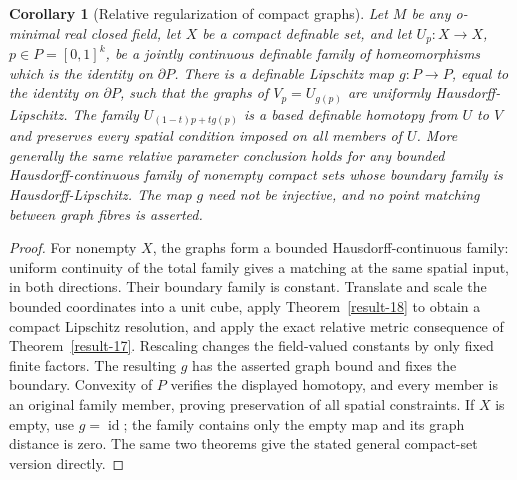 \documentclass[11pt,a4paper]{article}
\newtheorem{corollary}[theorem]{Corollary}
\theoremstyle{definition}
\begin{document}
\begin{corollary}[Relative regularization of compact graphs]\label{result-54}
Let $M$ be any o-minimal real closed field, let $X$ be a compact
definable set, and let $U_p:X\to X$, $p\in P=[0,1]^k$, be a jointly
continuous definable family of homeomorphisms which is the identity
on $\partial P$. There is a definable Lipschitz map $g:P\to P$,
equal to the identity on $\partial P$, such that the graphs of
$V_p=U_{g(p)}$ are uniformly Hausdorff-Lipschitz. The family
$U_{(1-t)p+tg(p)}$ is a based definable homotopy from $U$ to $V$ and
preserves every spatial condition imposed on all members of $U$.
More generally the same relative parameter conclusion holds for any
bounded Hausdorff-continuous family of nonempty compact sets whose
boundary family is Hausdorff-Lipschitz. The map $g$ need not be
injective, and no point matching between graph fibres is asserted.
\end{corollary}
\begin{proof}
For nonempty $X$, the graphs form a bounded Hausdorff-continuous family:
uniform continuity of the total family gives a matching at the same
spatial input, in both directions. Their boundary family is constant.
Translate and scale the bounded coordinates into a unit cube, apply
Theorem~\ref{result-18} to obtain a compact Lipschitz resolution, and
apply the exact relative metric consequence of Theorem~\ref{result-17}.
Rescaling changes the field-valued constants by only fixed finite
factors. The resulting $g$ has the asserted graph bound and fixes the
boundary. Convexity of $P$ verifies the displayed homotopy, and every
member is an original family member, proving preservation of all spatial
constraints. If $X$ is empty, use $g=\operatorname{id}$; the family
contains only the empty map and its graph distance is zero. The same
two theorems give the stated general compact-set version directly.
\end{proof}
\end{document}
